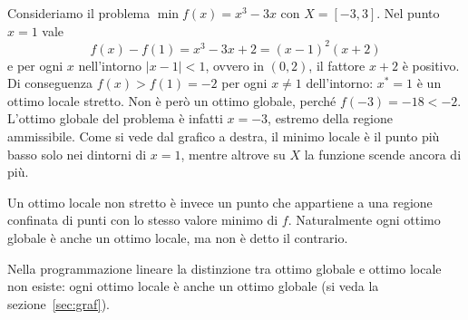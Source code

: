 \begin{esempiofig}
Consideriamo il problema $\min f(x) = x^3 - 3x$ con $X = [-3, 3]$. Nel punto $x = 1$ vale
\[
f(x) - f(1) = x^3 - 3x + 2 = (x - 1)^2 (x + 2)
\]
e per ogni $x$ nell'intorno $|x - 1| < 1$, ovvero in $(0, 2)$, il fattore $x + 2$ è positivo. Di conseguenza $f(x) > f(1) = -2$ per ogni $x \neq 1$ dell'intorno: $x^* = 1$ è un ottimo locale stretto. Non è però un ottimo globale, perché $f(-3) = -18 < -2$. L'ottimo globale del problema è infatti $x = -3$, estremo della regione ammissibile. Come si vede dal grafico a destra, il minimo locale è il punto più basso solo nei dintorni di $x = 1$, mentre altrove su $X$ la funzione scende ancora di più.
\tcblower
{}
\end{esempiofig}

Un ottimo locale non stretto è invece un punto che appartiene a una regione confinata di punti con lo stesso valore minimo di $f$. Naturalmente ogni ottimo globale è anche un ottimo locale, ma non è detto il contrario.

\begin{osservazione}
Nella programmazione lineare la distinzione tra ottimo globale e ottimo locale non esiste: ogni ottimo locale è anche un ottimo globale (si veda la sezione~\ref{sec:graf}).
\end{osservazione}

